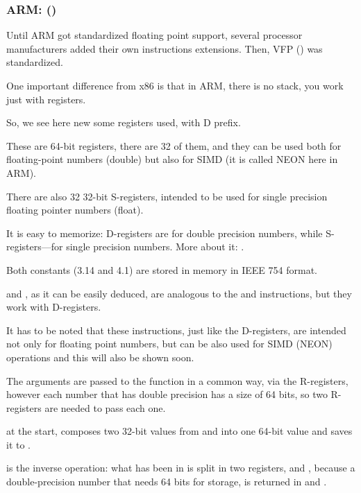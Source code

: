 \subsubsection{ARM: \OptimizingXcodeIV (\ARMMode)}

Until ARM got standardized floating point support, several processor manufacturers added their own 
instructions extensions.
Then, VFP () was standardized.

One important difference from x86 is that in ARM, there
is no stack, you work just with registers.




So, we see here new some registers used, with D prefix.

These are 64-bit registers, there are 32 of them, and they can be used both for floating-point numbers 
(double) but also for SIMD (it is called NEON here in ARM).

There are also 32 32-bit S-registers, intended to be used for single precision 
floating pointer numbers (float).

It is easy to memorize: D-registers are for double precision numbers, while
S-registers---for single precision numbers.
More about it: .

Both constants (3.14 and 4.1) are stored in memory in IEEE 754 format.

 and , as it can be easily deduced, are analogous to the  and \MOV instructions,
but they work with D-registers.

It has to be noted that these instructions, just like the D-registers, are intended not only for
floating point numbers, 
but can be also used for SIMD (NEON) operations and this will also be shown soon.

The arguments are passed to the function in a common way, via the R-registers, however
each number that has double precision has a size of 64 bits, so two R-registers are needed to pass each one.

 at the start, composes two 32-bit values from  and  into one 64-bit value
and saves it to .

 is the inverse operation: what has been in  
is split in two registers,  and , because a double-precision number 
that needs 64 bits for storage, is returned in  and .

